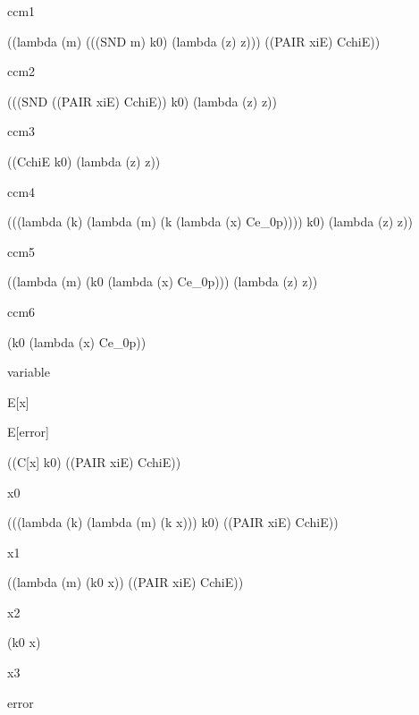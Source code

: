 \documentclass[ms,electronic,twosidetoc,letterpaper,chaptercenter,parttop]{byumsphd}
\begin{document}
\begin{singlespace}
ccm1
\begin{schemedisplay}
((lambda (m) (((SND m) k0) (lambda (z) z))) ((PAIR xiE) CchiE))
\end{schemedisplay}

ccm2
\begin{schemedisplay}
(((SND ((PAIR xiE) CchiE)) k0) (lambda (z) z))
\end{schemedisplay}

ccm3
\begin{schemedisplay}
((CchiE k0) (lambda (z) z))
\end{schemedisplay}

ccm4
\begin{schemedisplay}
(((lambda (k) (lambda (m) (k (lambda (x) Ce_0p)))) k0) (lambda (z) z))
\end{schemedisplay}

ccm5
\begin{schemedisplay}
((lambda (m) (k0 (lambda (x) Ce_0p))) (lambda (z) z))
\end{schemedisplay}

ccm6
\begin{schemedisplay}
(k0 (lambda (x) Ce_0p))
\end{schemedisplay}

variable
\begin{schemedisplay}
E[x]
\end{schemedisplay}

\begin{schemedisplay}
E[error]
\end{schemedisplay}

\begin{schemedisplay}
((C[x] k0) ((PAIR xiE) CchiE))
\end{schemedisplay}

x0
\begin{schemedisplay}
(((lambda (k) (lambda (m) (k x))) k0) ((PAIR xiE) CchiE))
\end{schemedisplay}

x1
\begin{schemedisplay}
((lambda (m) (k0 x)) ((PAIR xiE) CchiE))
\end{schemedisplay}

x2
\begin{schemedisplay}
(k0 x)
\end{schemedisplay}

x3
\begin{schemedisplay}
error
\end{schemedisplay}


\end{singlespace}
\end{document}
